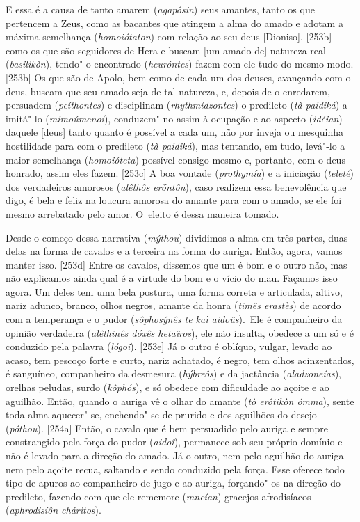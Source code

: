 E essa é a causa de tanto amarem (\emph{agapôsin}) seus amantes, tanto
os que pertencem a Zeus, como as bacantes que atingem a alma do amado e
adotam a máxima semelhança (\emph{homoiótaton}) com relação ao seu deus
[Dioniso], [253b] como os que são seguidores de Hera e buscam
[um amado de] natureza real (\emph{basilikòn}), tendo"-o encontrado
(\emph{heuróntes}) fazem com ele tudo do mesmo modo. [253b] Os que
são de Apolo, bem como de cada um dos deuses, avançando com o deus,
buscam que seu amado seja de tal natureza, e, depois de o enredarem,
persuadem (\emph{peíthontes}) e disciplinam (\emph{rhythmídzontes}) o
predileto (\emph{tà paidiká}) a imitá"-lo (\emph{mimoúmenoi}),
conduzem"-no assim à ocupação e ao aspecto (\emph{idéian}) daquele
[deus] tanto quanto é possível a cada um, não por inveja ou
mesquinha hostilidade para com o predileto (\emph{tà paidiká}), mas
tentando, em tudo, levá"-lo a maior semelhança (\emph{homoióteta})
possível consigo mesmo e, portanto, com o deus honrado, assim eles
fazem. [253c] A boa vontade (\emph{prothymía}) e a iniciação
(\emph{teletḗ}) dos verdadeiros amorosos (\emph{alêthôs erṓntôn}), caso
realizem essa benevolência que digo, é bela e feliz na loucura amorosa
do amante para com o amado, se ele foi mesmo arrebatado pelo amor. O~eleito é dessa maneira tomado.

Desde o começo dessa narrativa (\emph{mýthou}) dividimos a alma em três
partes, duas delas na forma de cavalos e a terceira na forma do auriga.
Então, agora, vamos manter isso. [253d] Entre os cavalos, dissemos
que um é bom e o outro não, mas não explicamos ainda qual é a virtude do
bom e o vício do mau. Façamos isso agora. Um deles tem uma bela postura,
uma forma correta e articulada, altivo, nariz adunco, branco, olhos
negros, amante da honra (\emph{timês erastḕs}) de acordo com a
temperança e o pudor (\emph{sôphosýnês te kaì aidoûs}).~Ele é
companheiro da opinião verdadeira (\emph{alêthinês dóxês hetaîros}), ele
não insulta, obedece a um só e é conduzido pela palavra (\emph{lógoi}).
[253e] Já o outro é oblíquo, vulgar, levado ao acaso, tem pescoço
forte e curto, nariz achatado, é negro, tem olhos acinzentados, é
sanguíneo, companheiro da desmesura (\emph{hýbreôs}) e da jactância
(\emph{aladzoneías}), orelhas peludas, surdo (\emph{kôphós}), e só
obedece com dificuldade ao açoite e ao aguilhão. Então, quando o auriga
vê o olhar do amante (\emph{tò erôtikòn ómma}), sente toda alma
aquecer"-se, enchendo"-se de prurido e dos aguilhões do desejo
(\emph{póthou}). [254a] Então, o cavalo que é bem persuadido pelo
auriga e sempre constrangido pela força do pudor (\emph{aidoî}),
permanece sob seu próprio domínio e não é levado para a direção do
amado. Já o outro, nem pelo aguilhão do auriga nem pelo açoite recua,
saltando e sendo conduzido pela força. Esse oferece todo tipo de apuros
ao companheiro de jugo e ao auriga, forçando"-os na direção do predileto,
fazendo com que ele rememore (\emph{mneían}) gracejos afrodisíacos
(\emph{aphrodisíôn cháritos}).

